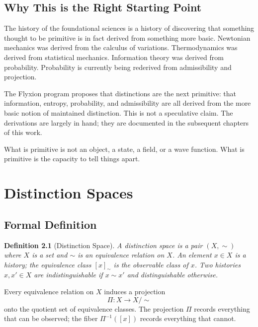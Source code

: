 \documentclass[12pt,a4paper]{book}
\newtheorem{definition}[theorem]{Definition}
\theoremstyle{remark}
\theoremstyle{definition}
\begin{document}
\section{Why This is the Right Starting Point}

The history of the foundational sciences is a history of discovering that
something thought to be primitive is in fact derived from something more
basic. Newtonian mechanics was derived from the calculus of variations.
Thermodynamics was derived from statistical mechanics. Information theory
was derived from probability. Probability is currently being rederived
from admissibility and projection.

The Flyxion program proposes that distinctions are the next primitive:
that information, entropy, probability, and admissibility are all derived
from the more basic notion of maintained distinction. This is not a
speculative claim. The derivations are largely in hand; they are
documented in the subsequent chapters of this work.

What is primitive is not an object, a state, a field, or a wave function.
What is primitive is the capacity to tell things apart.

\chapter{Distinction Spaces}

\section{Formal Definition}

\begin{definition}[Distinction Space]
A \emph{distinction space} is a pair $(X, \sim)$ where $X$ is a set
and $\sim$ is an equivalence relation on $X$. An element $x \in X$ is
a \emph{history}; the equivalence class $[x]_\sim$ is the \emph{observable
class} of $x$. Two histories $x, x' \in X$ are \emph{indistinguishable}
if $x \sim x'$ and \emph{distinguishable} otherwise.
\end{definition}

Every equivalence relation on $X$ induces a projection
\begin{equation}
  \Pi : X \to X/{\sim}
\end{equation}
onto the quotient set of equivalence classes. The projection $\Pi$ records
everything that can be observed; the fiber $\Pi^{-1}([x])$ records everything
that cannot.
\end{document}
